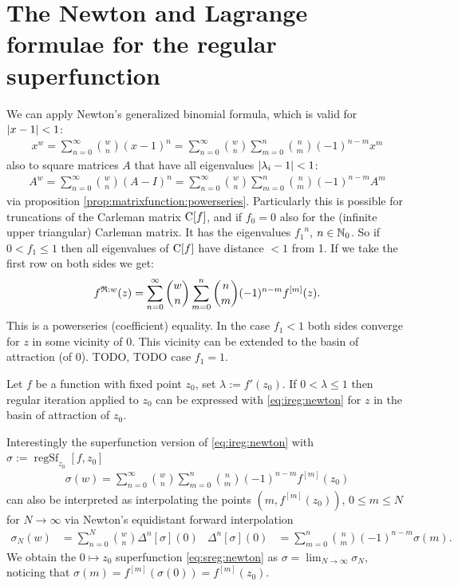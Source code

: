 \documentclass{article}
\numberwithin{equation}{section}
\begin{document}
\section{The Newton and Lagrange formulae for the regular
  superfunction}\label{sec:NewtonLagrange}
We can apply Newton's generalized binomial formula, which is valid for
$\left|x-1\right|<1$:
\begin{align*}
  x^w = \sum_{n=0}^\infty \binom{w}{n} (x-1)^n = \sum_{n=0}^\infty
  \binom{w}{n} \sum_{m=0}^n \binom{n}{m} (-1)^{n-m} x^m
\end{align*}
also to square matrices $A$ that have all eigenvalues
$\left|\lambda_i-1\right|<1$:
\begin{align*}
  A^w = \sum_{n=0}^\infty \binom{w}{n} (A-I)^n = \sum_{n=0}^\infty
  \binom{w}{n} \sum_{m=0}^n \binom{n}{m} (-1)^{n-m} A^m
\end{align*}
via proposition \ref{prop:matrixfunction:powerseries}. Particularly
this is possible for truncations of the Carleman matrix $\operatorname{C}[f]$,
and if $f_0=0$ also for the (infinite upper triangular) Carleman
matrix. It has the
eigenvalues ${f_1}^n$, $n\in\mathbb{N}_0$. So if $0<f_1\le 1$ then all
eigenvalues of $\operatorname{C}[f]$ have distance $<1$ from 1. If we take the
first row on both sides we get:
\begin{align}\label{eq:ireg:newton}
  {f}^{\mathfrak{R}:w}(z) = \sum_{n=0}^\infty
  \binom{w}{n} \sum_{m=0}^n \binom{n}{m} (-1)^{n-m} f^{[m]}(z).
\end{align}
This is a powerseries (coefficient) equality. In the case $f_1< 1$
both sides converge for $z$ in some vicinity of 0. This vicinity can
be extended to the basin of attraction (of 0). TODO, TODO case
$f_1=1$. 

\begin{proposition}
  Let $f$ be a function with fixed point $z_0$, set $\lambda:=f'(z_0)$. If
  $0<\lambda\le 1$ then regular iteration
  applied to $z_0$ can be expressed with \eqref{eq:ireg:newton} 
  for $z$ in the basin of attraction of $z_0$.
\end{proposition}

\newcommand{\sreg}{\operatorname{regSf}}
\newcommand{\areg}{\operatorname{regAb}}
Interestingly the superfunction version of \eqref{eq:ireg:newton} with
$\sigma:=\sreg_{z_0}[f,z_0]$
\begin{align}\label{eq:sreg:newton}
  \sigma(w) = \sum_{n=0}^\infty
  \binom{w}{n} \sum_{m=0}^n \binom{n}{m} (-1)^{n-m} f^{[m]}(z_0)
\end{align}
can also be interpreted as interpolating the points $(m,f^{[m]}(z_0))$,
$0\le m \le N$ for $N\to\infty$ via Newton's equidistant forward
interpolation
\begin{align}\label{eq:newton:forward}
  \sigma_N(w)&=\sum_{n=0}^N \binom{w}{n}\Delta^n[\sigma](0) &
  \Delta^n[\sigma](0) &= \sum_{m=0}^n \binom{n}{m}(-1)^{n-m}
  \sigma(m).
\end{align}
We obtain the $0\mapsto z_0$ superfunction \eqref{eq:sreg:newton} as
$\sigma = \lim_{N\to\infty} \sigma_N$, noticing that
$\sigma(m)=f^{[m]}(\sigma(0))=f^{[m]}(z_0)$.
\end{document}
